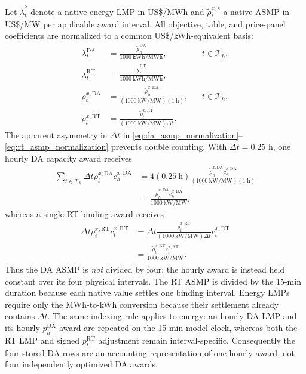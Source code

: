 \documentclass[final,5p,times]{elsarticle}
\newcommand{\dt}{\Delta t}
\newcommand{\DA}{\mathrm{DA}}
\newcommand{\RT}{\mathrm{RT}}
\newcommand{\calT}{\mathcal{T}}
\begin{document}
Let $\widetilde\lambda_t^s$ denote a native energy LMP in US\$/MWh and
$\widetilde\rho_t^{x,s}$ a native ASMP in US\$/MW per applicable award
interval. All objective, table, and price-panel coefficients are normalized to
a common US\$/kWh-equivalent basis:
\begin{align}
\lambda_t^{\DA}&=\frac{\widetilde\lambda_h^{\DA}}{1000~\mathrm{kWh/MWh}},
&&t\in\calT_h,\\
\lambda_t^{\RT}&=\frac{\widetilde\lambda_t^{\RT}}{1000~\mathrm{kWh/MWh}},
&& \label{eq:lmp_normalization}\\
\rho_t^{x,\DA}&=\frac{\widetilde\rho_h^{x,\DA}}{(1000~\mathrm{kW/MW})(1~\mathrm{h})},
&&t\in\calT_h, \label{eq:da_asmp_normalization}\\
\rho_t^{x,\RT}&=\frac{\widetilde\rho_t^{x,\RT}}
{(1000~\mathrm{kW/MW})\dt}.
&& \label{eq:rt_asmp_normalization}
\end{align}
The apparent asymmetry in $\Delta t$ in \eqref{eq:da_asmp_normalization}--
\eqref{eq:rt_asmp_normalization} prevents double counting. With $\dt=0.25$ h,
one hourly DA capacity award receives
\begin{align}
\sum_{t\in\calT_h}\dt\rho_t^{x,\DA}c_h^{x,\DA}
&=4(0.25~\mathrm{h})
\frac{\widetilde\rho_h^{x,\DA}c_h^{x,\DA}}
{(1000~\mathrm{kW/MW})(1~\mathrm{h})}\nonumber\\
&=\frac{\widetilde\rho_h^{x,\DA}c_h^{x,\DA}}{1000~\mathrm{kW/MW}},
\label{eq:da_capacity_payment_check}
\end{align}
whereas a single RT binding award receives
\begin{align}
\dt\rho_t^{x,\RT}c_t^{x,\RT}
&=\dt\frac{\widetilde\rho_t^{x,\RT}}
{(1000~\mathrm{kW/MW})\dt}c_t^{x,\RT}\nonumber\\
&=\frac{\widetilde\rho_t^{x,\RT}c_t^{x,\RT}}{1000~\mathrm{kW/MW}}.
\label{eq:rt_capacity_payment_check}
\end{align}
Thus the DA ASMP is \emph{not} divided by four; the hourly award is instead
held constant over its four physical intervals. The RT ASMP is divided by the
15-min duration because each native value settles one binding interval. Energy
LMPs require only the MWh-to-kWh conversion because their settlement already
contains $\dt$. The same indexing rule applies to energy: an hourly DA LMP and
its hourly $p_h^{\DA}$ award are repeated on the 15-min model clock, whereas
both the RT LMP and signed $p_t^{\RT}$ adjustment remain interval-specific.
Consequently the four stored DA rows are an accounting representation of one
hourly award, not four independently optimized DA awards.
\end{document}
